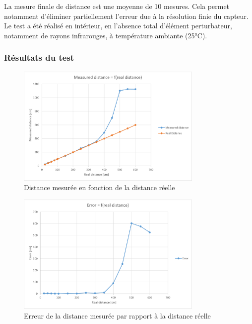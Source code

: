 La mesure finale de distance est une moyenne de 10 mesures. Cela permet notamment d'éliminer partiellement
l'erreur due à la résolution finie du capteur.\\
Le test a été réalisé en intérieur, en l'absence total d'élément perturbateur, notamment de rayons 
infrarouges, à température ambiante (25°C).

\subsubsection{Résultats du test}

\begin{figure}[H]
    \centering
    \includegraphics[width=0.8\textwidth]{Images/LiDAR/LiDARRealDistanceGraph_MesDist.png}
    \caption{Distance mesurée en fonction de la distance réelle}
    \label{fig:RealDistanceMesGraph}
\end{figure}

\begin{figure}[H]
    \centering
    \includegraphics[width=0.8\textwidth]{Images/LiDAR/LiDARRealDistanceGraph_MesDistError.png}
    \caption{Erreur de la distance mesurée par rapport à la distance réelle}
    \label{fig:RealDistanceMesGraphError}
\end{figure}

